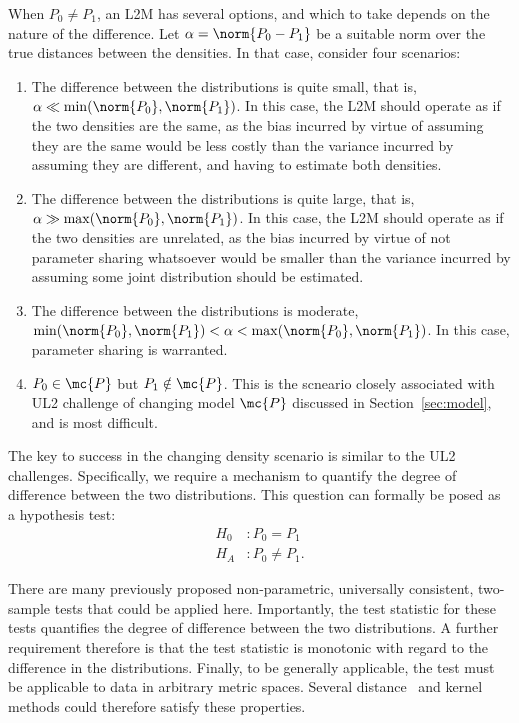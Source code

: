 \documentclass{article}
\begin{document}
When $P_0 \neq P_1$, an L2M  has several options, and which to take depends on the nature of the difference.  Let $\alpha=\norm{ P_0 - P_1}$ be a suitable norm over the true distances between the densities.  In that case, consider four scenarios:
\begin{enumerate}
    \item The difference between the distributions is quite small, that is, $\alpha \ll \min (\norm{P_0},\norm{P_1} )$.  In this case, the L2M should operate as if the two densities are the same, as the bias incurred by virtue of assuming they are the same would be less costly than the variance incurred by assuming they are different, and having to estimate both densities.
    \item The difference between the distributions is quite large, that is, $\alpha \gg \max (\norm{P_0},\norm{P_1} )$. In this case, the L2M should operate as if the two densities are unrelated, as the bias incurred by virtue of not parameter sharing whatsoever would be smaller than the variance incurred by assuming some joint distribution should be estimated.
    \item The difference between the distributions is moderate, $\min (\norm{P_0},\norm{P_1} ) < \alpha < \max (\norm{P_0},\norm{P_1} )$.  In this case, parameter sharing is warranted. 
    \item $P_0 \in \mc{P}$ but $P_1 \notin \mc{P}$.  This is the scneario closely associated with UL2 challenge of changing model $\mc{P}$ discussed in Section~\ref{sec:model}, and is most difficult. 
\end{enumerate}

The key to success in the changing density scenario is similar to the UL2 challenges.  Specifically, we require a mechanism to quantify the degree of difference between the two distributions.  This question can formally be posed as a hypothesis test:
\begin{align*}
    H_0 &: P_0 = P_1 \\
    H_A &: P_0 \neq P_1.
\end{align*}

There are many previously proposed non-parametric, universally consistent,  two-sample tests that could be applied here.  Importantly, the test statistic for these tests quantifies the degree of difference between the two distributions.  A further requirement therefore is that the test statistic is monotonic with regard to the difference in the distributions.  Finally, to be generally applicable, the test must be applicable to data in arbitrary metric spaces.  Several distance~\cite{energy} and kernel~\cite{mmd} methods could therefore satisfy these properties. 
\end{document}
